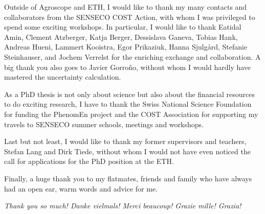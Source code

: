 Outside of Agroscope and ETH, I would like to thank my many contacts and collaborators from the SENSECO COST Action, with whom I was privileged to spend some exciting workshops. In particular, I would like to thank Eatidal Amin, Clement Atzberger, Katja Berger, Dessislava Ganeva, Tobias Hank, Andreas Hueni, Lammert Kooistra, Egor Prikaziuk, Hanna Sjulgård, Stefanie Steinhauser, and Jochem Verrelst for the enriching exchange and collaboration. A big thank you also goes to Javier Gorro\~{n}o, without whom I would hardly have mastered the uncertainty calculation.

As a PhD thesis is not only about science but also about the financial resources to do exciting research, I have to thank the Swiss National Science Foundation for funding the PhenomEn project and the COST Association for supporting my travels to SENSECO summer schools, meetings and workshops.

Last but not least, I would like to thank my former supervisors and teachers, Stefan Lang and Dirk Tiede, without whom I would not have even noticed the call for applications for the PhD position at the ETH.

Finally, a huge thank you to my flatmates, friends and family who have always had an open ear, warm words and advice for me.

\bigskip
\centering
\textit{Thank you so much! Danke vielmals! Merci beaucoup! Grazie mille! Grazia!}
